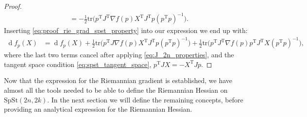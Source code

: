 \begin{proof}
\begin{align}
        &=-\tfrac{1}{2} \mathrm{tr}\big(p ^{\mathrm{T}}J ^{\mathrm{T}} \nabla f(p)X ^{\mathrm{T}}J ^{\mathrm{T}}p(p ^{\mathrm{T}}p)^{-1}\big). \label{eq:proof_rie_grad_spst_property}
    \end{align}
    Inserting \eqref{eq:proof_rie_grad_spst_property} into our expression we end up with:
    \begin{equation*}
        \begin{split}
            \operatorname{d}f_{p}(X)&= \operatorname{d}f_{p}(X)+\tfrac{1}{2} \mathrm{tr}\big(p ^{\mathrm{T}}J \nabla f(p)X ^{\mathrm{T}}J ^{\mathrm{T}}p(p ^{\mathrm{T}}p)^{-1}\big)+\tfrac{1}{2}\mathrm{tr}\big(p ^{\mathrm{T}}J ^{\mathrm{T}}\nabla f(p) p ^{\mathrm{T}}J ^{\mathrm{T}}X(p ^{\mathrm{T}}p)^{-1}\big),
        \end{split}
    \end{equation*}
    where the last two terms cancel after applying \eqref{eq:J_2n_properties}, and the tangent space condition \eqref{eq:spst_tangent_space}, $p ^{\mathrm{T}}JX=-X ^{\mathrm{T}}Jp$.
\end{proof}
Now that the expression for the Riemannian gradient is established, we have almost all the tools needed to be able to define the Riemannian Hessian on $\mathrm{SpSt}(2n, 2k)$. In the next section we will define the remaining concepts, before providing an analytical expression for the Riemannian Hessian.